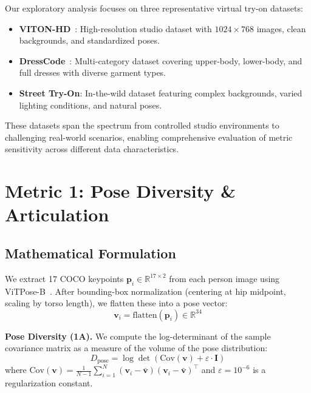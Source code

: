 \documentclass[runningheads]{llncs}
\newcommand{\R}{\mathbb{R}}
\newcommand{\Cov}{\mathrm{Cov}}
\newcommand{\bvec}[1]{\bm{#1}}
\newcommand{\logdet}{\log\det}
\begin{document}
Our exploratory analysis focuses on three representative virtual try-on datasets:

\begin{itemize}
    \item \textbf{VITON-HD}~\cite{choi2021vitonhd}: High-resolution studio dataset with $1024 \times 768$ images, clean backgrounds, and standardized poses.
    \item \textbf{DressCode}~\cite{morelli2022dresscode}: Multi-category dataset covering upper-body, lower-body, and full dresses with diverse garment types.
    \item \textbf{Street Try-On}: In-the-wild dataset featuring complex backgrounds, varied lighting conditions, and natural poses.
\end{itemize}

These datasets span the spectrum from controlled studio environments to challenging real-world scenarios, enabling comprehensive evaluation of metric sensitivity across different data characteristics.


\section{Metric 1: Pose Diversity \& Articulation}
\label{sec:m1_pose}

\subsection{Mathematical Formulation}

We extract 17 COCO keypoints $\bvec{p}_i \in \R^{17 \times 2}$ from each person image using ViTPose-B~\cite{xu2022vitpose}. After bounding-box normalization (centering at hip midpoint, scaling by torso length), we flatten these into a pose vector:
\begin{equation}
    \bvec{v}_i = \text{flatten}(\bvec{p}_i) \in \R^{34}
\end{equation}

\textbf{Pose Diversity (1A).} We compute the log-determinant of the sample covariance matrix as a measure of the volume of the pose distribution:
\begin{equation}
    D_{\text{pose}} = \logdet\left(\Cov(\bvec{v}) + \varepsilon \cdot \bvec{I}\right)
\end{equation}
where $\Cov(\bvec{v}) = \frac{1}{N-1}\sum_{i=1}^{N}(\bvec{v}_i - \bar{\bvec{v}})(\bvec{v}_i - \bar{\bvec{v}})^\top$ and $\varepsilon = 10^{-6}$ is a regularization constant.
\end{document}
